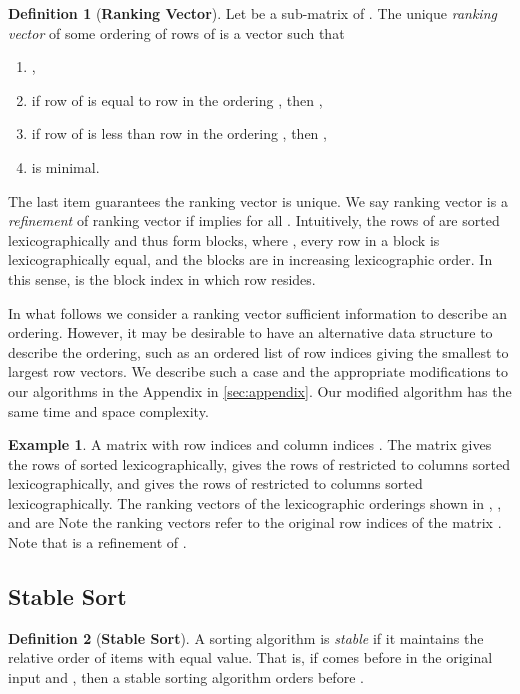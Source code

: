 \documentclass[a4paper,10pt,reqno]{amsart}
\theoremstyle{definition}
\newtheorem{definition}{Definition}
\newtheorem{example}{Example}
\begin{document}
\begin{definition}[\bf Ranking Vector]
Let  be a sub-matrix of . 
The unique \emph{ranking vector}  of some 
ordering  of rows of  is a vector such that
\begin{enumerate}
    \item ,
    \item if row  of  is equal to row  in the ordering , then ,
    \item if row  of  is less than row  in the ordering , then ,
    \item  is minimal.
\end{enumerate}
\end{definition}
The last item guarantees the ranking vector  is unique. We say ranking
vector  is a \emph{refinement} of ranking vector  if 
implies  for all .
Intuitively, the  rows of  are sorted lexicographically and thus form
 blocks, where , every row in a block is lexicographically equal,
and the  blocks are in increasing lexicographic order. In this sense, 
is the block index in which row  resides.

In what follows we consider a ranking vector sufficient information to describe
an ordering. However, it may be desirable to have an alternative data structure
to describe the ordering, such as an ordered list of row indices giving the
smallest to largest row vectors. We describe such a case and the appropriate 
modifications to our algorithms in the Appendix in \autoref{sec:appendix}.
Our modified algorithm has the same time and space complexity.






\begin{example}

A matrix  with row indices  and column indices
. The matrix  gives the rows of  sorted
lexicographically,  gives the rows of  restricted to columns
 sorted lexicographically, and  gives the rows of 
restricted to columns  sorted lexicographically.  The ranking vectors
of the lexicographic orderings shown in , , and  are  Note the ranking vectors refer to the original
row indices of the matrix .  Note that  is a refinement of .
\label{ex:D}
\end{example}
    
\subsection{Stable Sort}
\begin{definition}[\bf Stable Sort]
A sorting algorithm is \emph{stable} if it maintains the relative order of
items with equal value. That is, if  comes before  in the original input
and , then a stable sorting algorithm orders  before .
\end{definition}
\end{document}
